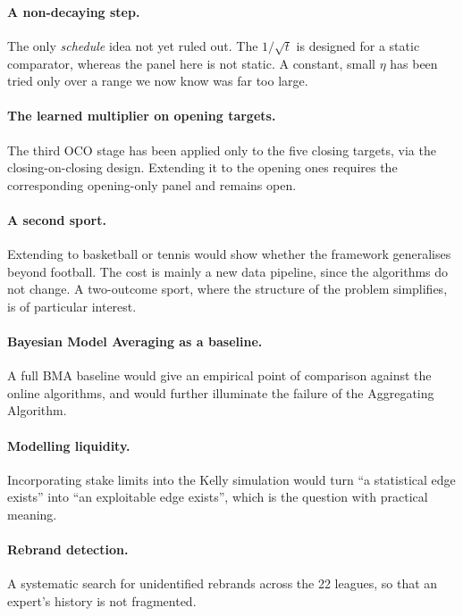 \documentclass[12pt,a4paper,oneside]{report}
\renewcommand{\_}{\oldunderscore\allowbreak}
\theoremstyle{definition}
\theoremstyle{plain}
\theoremstyle{remark}
\begin{document}
\paragraph{A non-decaying step.} The only \emph{schedule} idea not yet ruled out. The $1/\sqrt{t}$
is designed for a static comparator, whereas the panel here is not static. A constant, small
$\eta$ has been tried only over a range we now know was far too large.

\paragraph{The learned multiplier on opening targets.} The third OCO stage has been applied only
to the five closing targets, via the closing-on-closing design. Extending it to the opening ones
requires the corresponding opening-only panel and remains open.

\paragraph{A second sport.} Extending to basketball or tennis would show whether the framework
generalises beyond football. The cost is mainly a new data pipeline, since the algorithms do not
change. A two-outcome sport, where the structure of the problem simplifies, is of particular
interest.

\paragraph{Bayesian Model Averaging as a baseline.} A full BMA baseline would give an empirical
point of comparison against the online algorithms, and would further illuminate the failure of the
Aggregating Algorithm.

\paragraph{Modelling liquidity.} Incorporating stake limits into the Kelly simulation would turn
``a statistical edge exists'' into ``an exploitable edge exists'', which is the question with
practical meaning.

\paragraph{Rebrand detection.} A systematic search for unidentified rebrands across the 22
leagues, so that an expert's history is not fragmented.

\appendix

\end{document}
